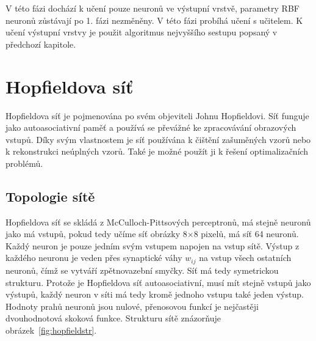 \documentclass[11pt,twoside,a4paper]{book}
\begin{document}
\begin{itemize}
V této fázi dochází k učení pouze neuronů ve výstupní vrstvě, parametry RBF neuronů zůstávají po 1. fázi nezměněny. V této fázi probíhá učení s učitelem. K učení výstupní vrstvy je použit algoritmus nejvyššího sestupu popsaný v předchozí kapitole.
\end{itemize} 

\section{Hopfieldova síť}
Hopfieldova síť je pojmenována po svém objeviteli Johnu Hopfieldovi. Síť funguje jako autoasociativní paměť a používá se převážné ke zpracovávání obrazových vstupů. Díky svým vlastnostem je síť používána k čištění zašuměných vzorů nebo k rekonstrukci neúplných vzorů. Také je možné použít ji k řešení optimalizačních problémů.

\subsection{Topologie sítě}
Hopfieldova síť se skládá z McCulloch-Pittsových perceptronů, má stejně neuronů jako má vstupů, pokud tedy učíme síť obrázky 8\begin{math}\times\end{math}8 pixelů, má síť 64 neuronů. Každý neuron je pouze jedním svým vstupem napojen na vstup sítě. Výstup z každého neuronu je veden přes synaptické váhy \begin{math}w_{ij}\end{math} na vstup všech ostatních neuronů, čímž se vytváří zpětnovazební smyčky. Síť má tedy symetrickou strukturu. Protože je Hopfieldova síť autoasociativní, musí mít stejně vstupů jako výstupů, každý neuron v síti má tedy kromě jednoho vstupu také jeden výstup. Hodnoty prahů neuronů jsou nulové, přenosovou funkcí je nejčastěji dvouhodnotová skoková funkce. Strukturu sítě znázorňuje obrázek~\ref{fig:hopfieldstr}.
\end{document}

